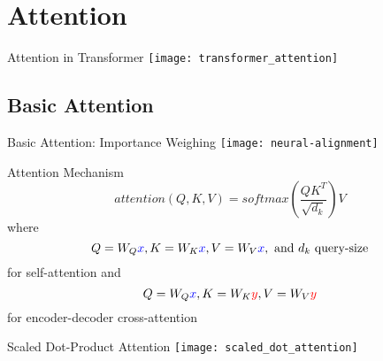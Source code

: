 \section{Attention}

\begin{frame}[c]{Attention in Transformer}
    \texttt{[image: transformer\_attention]}
\end{frame}


\subsection{Basic Attention}

\begin{frame}[c]{Basic Attention: Importance Weighing}
    \texttt{[image: neural-alignment]}
\end{frame}

\begin{frame}[c]{Attention Mechanism}
    \large
    $$attention(Q, K, V) = softmax(\frac{QK^T}{\sqrt{d_k}})V$$
    \pause
    where
    $$Q = W_Q\textcolor{blue}{x}, K = W_K\textcolor{blue}{x}, V = W_V\textcolor{blue}{x}, \text{ and } d_k \text{ query-size}$$
    for self-attention \pause and
    $$Q = W_Q\textcolor{blue}{x}, K = W_K\textcolor{red}{y}, V = W_V\textcolor{red}{y}$$
    for encoder-decoder cross-attention
\end{frame}


\begin{frame}[c]{Scaled Dot-Product Attention}
    \texttt{[image: scaled\_dot\_attention]}
\end{frame}


